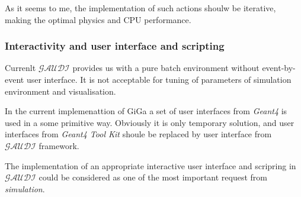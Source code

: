 \documentclass[nfss,times,12pt,a4paper]{article}
\begin{document}
As it seems to me, the implementation of such actions shoulw be 
iterative, making the optimal physics and CPU performance. 

  \subsubsection{ Interactivity and user interface and scripting } 

Currenlt ${\mathcal{GAUDI}}$ provides us with a pure batch environment
without event-by-event user interface. It is not acceptable for 
tuning of parameters of simulation environment and visualisation. 

In the current implemenattion of {\sc GiGa} a set of user interfaces 
from {\it Geant4} is used in a some primitive way. Obviously it is 
only temporary solution, and user interfaces from {\it Geant4 Tool Kit}
shoule be replaced by user interface from ${\mathcal{GAUDI}}$ framework. 

The implementation of an appropriate interactive user interface 
and scripring in ${\mathcal{GAUDI}}$ could be considered as one of 
the most important request from {\it simulation}.  

  
\end{document}
